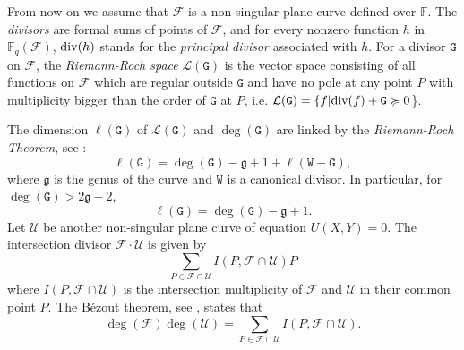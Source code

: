 \documentclass[9pt]{article}
\theoremstyle{plain}
\begin{document}

From now on we assume that $\mathcal{F}$ is a non-singular plane curve defined over $\mathbb{F}$.
The \emph{divisors} are formal sums of points of $\mathcal F$, and for every nonzero function $h$ in $\mathbb F_q(\mathcal F)$,  ${\rm{div}}(h)$ stands for the \textit{principal divisor} associated with $h$.
For a divisor $\mathtt G$ on $\mathcal F$, the \textit{Riemann-Roch space} $\mathcal L(\mathtt G)$ is the vector space consisting of all functions on $\mathcal{F}$ which are regular outside $\mathtt G$ and have no pole at any point $P$ with multiplicity bigger than  the order of $\mathtt{G}$ at $P$, i.e.  $\mathcal L(\mathtt G)=\{f|{\rm{div}} (f)+\mathtt{G}\succcurlyeq 0$\}.

The dimension $\ell(\mathtt G)$ of $\mathcal L(\mathtt G)$ and  $\deg(\mathtt G)$ are linked
by the \textit{Riemann-Roch Theorem}, see \cite[Theorem 6.70]{HKT}:
\begin{equation}
\label{eq02112025}   \ell(\mathtt G) = \deg(\mathtt G)-\mathfrak  g + 1+\ell(\mathtt W-\mathtt G),
\end{equation}
where $\mathfrak  g$ is the genus of the curve and $\mathtt W$ is a canonical divisor. In particular, for $\deg(\mathtt G)>2\mathfrak  g-2$,
\[\ell(\mathtt G) = \deg(\mathtt G) -\mathfrak  g+1.\]
Let $\mathcal{U}$ be another non-singular plane curve of equation $U(X,Y)=0$. The intersection divisor $\mathcal{F}\cdot \mathcal{U}$ is given by 
$$\sum_{P\in \mathcal{F}\cap\mathcal{U}} I(P,\mathcal{F}\cap\mathcal{U})P$$ 
where $I(P,\mathcal{F}\cap\mathcal{U})$ is the intersection multiplicity of $\mathcal{F}$ and $\mathcal{U}$ in their common point $P$. The B\'ezout theorem, see \cite[Theorem 3.14]{HKT}, states that 
$$\deg(\mathcal{F})\deg(\mathcal{U})= \sum_{P\in \mathcal{F}\cap\mathcal{U}}I(P,\mathcal{F}\cap \mathcal{U}).$$ 
\end{document}
